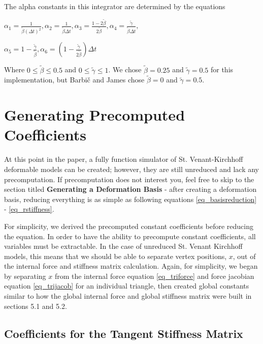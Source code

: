 \documentclass[twocolumn,10pt]{asme2ej}
\begin{document}
The alpha constants in this integrator are determined by the equations

\begin{center}
$\alpha_1 = \frac{1}{\tilde{\beta}(\Delta t)^2}, \alpha_2 = \frac{1}{\tilde{\beta}\Delta t},
\alpha_3 = \frac{1 - 2\tilde{\beta}}{2\tilde{\beta}}, \alpha_4 = \frac{\tilde{\gamma}}{\tilde{\beta}\Delta t},$

$\alpha_5 = 1 - \frac{\tilde{\gamma}}{\tilde{\beta}}, \alpha_6 = \left(1 - \frac{\tilde{\gamma}}{2\tilde{\beta}}\right)\Delta t$
\end{center}

Where $0 \leq \tilde{\beta} \leq 0.5$ and $0 \leq \tilde{\gamma} \leq 1$. We chose $\tilde{\beta} = 0.25$ and $\tilde{\gamma} = 0.5$ for this implementation, but Barbič and James chose $\tilde{\beta} = 0$ and $\tilde{\gamma} = 0.5$.

\section{Generating Precomputed Coefficients}

At this point in the paper, a fully function simulator of St. Venant-Kirchhoff deformable models can be created; however, they are still unreduced and lack any precomputation. If precomputation does not interest you, feel free to skip to the section titled \textbf{Generating a Deformation Basis} - after creating a deformation basis, reducing everything is as simple as following equations \ref{eq_basisreduction} - \ref{eq_rstiffness}.

For simplicity, we derived the precomputed constant coefficients before reducing the equation. In order to have the ability to precompute constant coefficients, all variables must be extractable. In the case of unreduced St. Venant Kirchhoff models, this means that we should be able to separate vertex positions, $x$, out of the internal force and stiffness matrix calculation. Again, for simplicity, we began by separating $x$ from the internal force equation \ref{eq_triforce} and force jacobian equation \ref{eq_trijacob} for an individual triangle, then created global constants similar to how the global internal force and global stiffness matrix were built in sections 5.1 and 5.2.

\subsection{Coefficients for the Tangent Stiffness Matrix}
\end{document}
